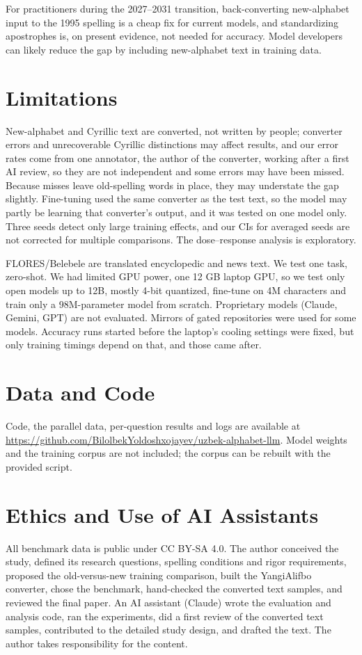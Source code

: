 For practitioners during the 2027--2031 transition, back-converting new-alphabet input to the 1995 spelling is a cheap fix for current models, and standardizing apostrophes is, on present evidence, not needed for accuracy. Model developers can likely reduce the gap by including new-alphabet text in training data.

\section*{Limitations}
New-alphabet and Cyrillic text are converted, not written by people; converter errors and unrecoverable Cyrillic distinctions may affect results, and our error rates come from one annotator, the author of the converter, working after a first AI review, so they are not independent and some errors may have been missed. Because misses leave old-spelling words in place, they may understate the gap slightly. Fine-tuning used the same converter as the test text, so the model may partly be learning that converter's output, and it was tested on one model only. Three seeds detect only large training effects, and our CIs for averaged seeds are not corrected for multiple comparisons. The dose--response analysis is exploratory.

FLORES/Belebele are translated encyclopedic and news text. We test one task, zero-shot. We had limited GPU power, one 12 GB laptop GPU, so we test only open models up to 12B, mostly 4-bit quantized, fine-tune on 4M characters and train only a 98M-parameter model from scratch. Proprietary models (Claude, Gemini, GPT) are not evaluated. Mirrors of gated repositories were used for some models. Accuracy runs started before the laptop's cooling settings were fixed, but only training timings depend on that, and those came after.

\section*{Data and Code}
Code, the parallel data, per-question results and logs are available at \url{https://github.com/BilolbekYoldoshxojayev/uzbek-alphabet-llm}. Model weights and the training corpus are not included; the corpus can be rebuilt with the provided script.

\section*{Ethics and Use of AI Assistants}
All benchmark data is public under CC BY-SA 4.0. The author conceived the study, defined its research questions, spelling conditions and rigor requirements, proposed the old-versus-new training comparison, built the YangiAlifbo converter, chose the benchmark, hand-checked the converted text samples, and reviewed the final paper. An AI assistant (Claude) wrote the evaluation and analysis code, ran the experiments, did a first review of the converted text samples, contributed to the detailed study design, and drafted the text. The author takes responsibility for the content.

